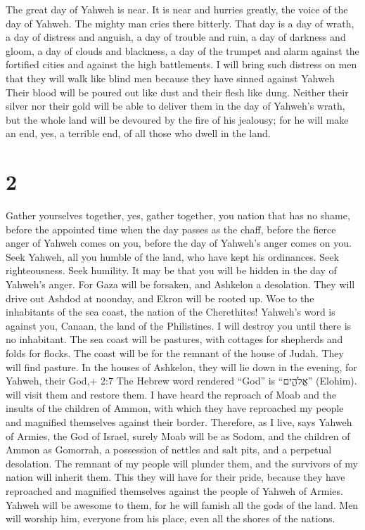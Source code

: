  The great day of Yahweh is near. It is near and hurries
greatly, the voice of the day of Yahweh. The mighty man cries there
bitterly.  That day is a day of wrath, a day of distress
and anguish, a day of trouble and ruin, a day of darkness and gloom, a
day of clouds and blackness,  a day of the trumpet and
alarm against the fortified cities and against the high battlements.
 I will bring such distress on men that they will walk like
blind men because they have sinned against Yahweh Their blood will be
poured out like dust and their flesh like dung.  Neither
their silver nor their gold will be able to deliver them in the day of
Yahweh's wrath, but the whole land will be devoured by the fire of his
jealousy; for he will make an end, yes, a terrible end, of all those who
dwell in the land.

\hypertarget{section-1}{%
\section{2}\label{section-1}}

 Gather yourselves together, yes, gather together, you
nation that has no shame,  before the appointed time when
the day passes as the chaff, before the fierce anger of Yahweh comes on
you, before the day of Yahweh's anger comes on you.  Seek
Yahweh, all you humble of the land, who have kept his ordinances. Seek
righteousness. Seek humility. It may be that you will be hidden in the
day of Yahweh's anger.  For Gaza will be forsaken, and
Ashkelon a desolation. They will drive out Ashdod at noonday, and Ekron
will be rooted up.  Woe to the inhabitants of the sea coast,
the nation of the Cherethites! Yahweh's word is against you, Canaan, the
land of the Philistines. I will destroy you until there is no
inhabitant.  The sea coast will be pastures, with cottages
for shepherds and folds for flocks.  The coast will be for
the remnant of the house of Judah. They will find pasture. In the houses
of Ashkelon, they will lie down in the evening, for Yahweh, their God,+
2:7 The Hebrew word rendered ``God'' is ``אֱלֹהִ֑ים'' (Elohim). will
visit them and restore them.  I have heard the reproach of
Moab and the insults of the children of Ammon, with which they have
reproached my people and magnified themselves against their border.
 Therefore, as I live, says Yahweh of Armies, the God of
Israel, surely Moab will be as Sodom, and the children of Ammon as
Gomorrah, a possession of nettles and salt pits, and a perpetual
desolation. The remnant of my people will plunder them, and the
survivors of my nation will inherit them.  This they will
have for their pride, because they have reproached and magnified
themselves against the people of Yahweh of Armies.  Yahweh
will be awesome to them, for he will famish all the gods of the land.
Men will worship him, everyone from his place, even all the shores of
the nations.

